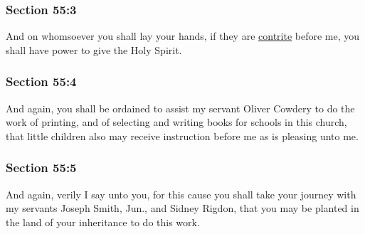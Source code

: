 	\subsubsection{Section 55:3} %
		\label{DC55-3}

		And on whomsoever you shall lay your hands, if they are \hyperref[CONTRITE]{contrite} before me, you shall have power to give the Holy Spirit.


	\subsubsection{Section 55:4} %
		\label{DC55-4}

		And again, you shall be ordained to assist my servant Oliver Cowdery to do the work of printing, and of selecting and writing books for schools in this church, that little children also may receive instruction before me as is pleasing unto me.


	\subsubsection{Section 55:5} %
		\label{DC55-5}

		And again, verily I say unto you, for this cause you shall take your journey with my servants Joseph Smith, Jun., and Sidney Rigdon, that you may be planted in the land of your inheritance to do this work.


